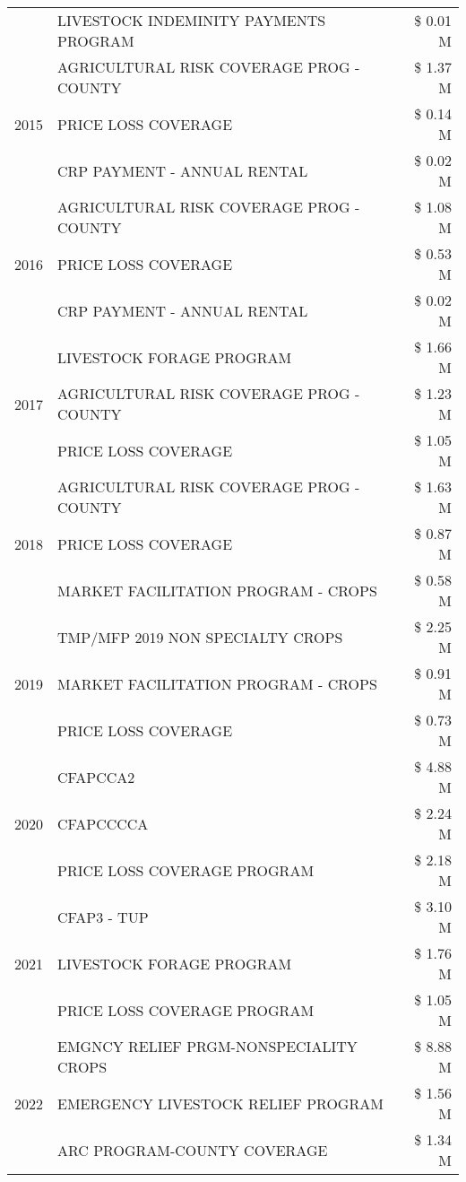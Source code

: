\begin{tabular}{llr}
 & LIVESTOCK INDEMINITY PAYMENTS PROGRAM & \$ 0.01 M \\
\cline{1-3}
\multirow[t]{3}{*}{2015} & AGRICULTURAL RISK COVERAGE PROG - COUNTY & \$ 1.37 M \\
 & PRICE LOSS COVERAGE & \$ 0.14 M \\
 & CRP PAYMENT - ANNUAL RENTAL & \$ 0.02 M \\
\cline{1-3}
\multirow[t]{3}{*}{2016} & AGRICULTURAL RISK COVERAGE PROG - COUNTY & \$ 1.08 M \\
 & PRICE LOSS COVERAGE & \$ 0.53 M \\
 & CRP PAYMENT - ANNUAL RENTAL & \$ 0.02 M \\
\cline{1-3}
\multirow[t]{3}{*}{2017} & LIVESTOCK FORAGE PROGRAM & \$ 1.66 M \\
 & AGRICULTURAL RISK COVERAGE PROG - COUNTY & \$ 1.23 M \\
 & PRICE LOSS COVERAGE & \$ 1.05 M \\
\cline{1-3}
\multirow[t]{3}{*}{2018} & AGRICULTURAL RISK COVERAGE PROG - COUNTY & \$ 1.63 M \\
 & PRICE LOSS COVERAGE & \$ 0.87 M \\
 & MARKET FACILITATION PROGRAM - CROPS & \$ 0.58 M \\
\cline{1-3}
\multirow[t]{3}{*}{2019} & TMP/MFP 2019 NON SPECIALTY CROPS & \$ 2.25 M \\
 & MARKET FACILITATION PROGRAM - CROPS & \$ 0.91 M \\
 & PRICE LOSS COVERAGE & \$ 0.73 M \\
\cline{1-3}
\multirow[t]{3}{*}{2020} & CFAPCCA2 & \$ 4.88 M \\
 & CFAPCCCCA & \$ 2.24 M \\
 & PRICE LOSS COVERAGE PROGRAM & \$ 2.18 M \\
\cline{1-3}
\multirow[t]{3}{*}{2021} & CFAP3 - TUP & \$ 3.10 M \\
 & LIVESTOCK FORAGE PROGRAM & \$ 1.76 M \\
 & PRICE LOSS COVERAGE PROGRAM & \$ 1.05 M \\
\cline{1-3}
\multirow[t]{3}{*}{2022} & EMGNCY RELIEF PRGM-NONSPECIALITY CROPS & \$ 8.88 M \\
 & EMERGENCY LIVESTOCK RELIEF PROGRAM & \$ 1.56 M \\
 & ARC PROGRAM-COUNTY COVERAGE & \$ 1.34 M \\
\cline{1-3}
\bottomrule
\end{tabular}
